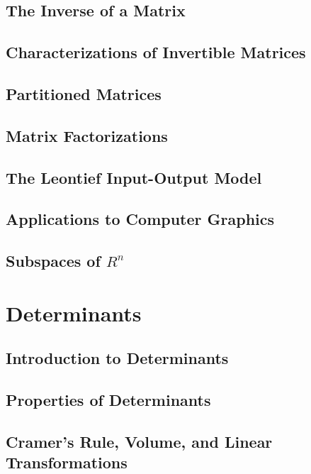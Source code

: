 \documentclass{package/notes}
\begin{document}
\section{The Inverse of a Matrix}

\section{Characterizations of Invertible Matrices}

\section{Partitioned Matrices}

\section{Matrix Factorizations}

\section{The Leontief Input-Output Model}

\section{Applications to Computer Graphics}

\section{Subspaces of $R^n$}




\chapter{Determinants}

\section{Introduction to Determinants}

\section{Properties of Determinants}

\section{Cramer's Rule, Volume, and Linear Transformations}
\end{document}
